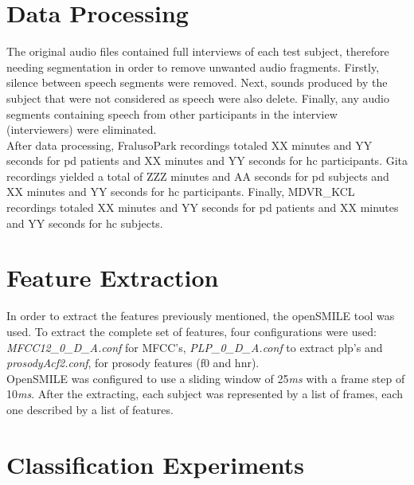 \section{Data Processing}

The original audio files contained full interviews of each test subject, therefore needing segmentation in order to remove unwanted audio fragments. Firstly, silence between speech segments were removed. Next, sounds produced by the subject that were not considered as speech were also delete. Finally, any audio segments containing speech from other participants in the interview (interviewers) were eliminated.
\\
After data processing, FralusoPark recordings totaled XX minutes and YY seconds for \gls{pd} patients and XX minutes and YY seconds for \gls{hc} participants. Gita recordings yielded a total of ZZZ minutes and AA seconds for \gls{pd} subjects and XX minutes and YY seconds for \gls{hc} participants. Finally, MDVR\_KCL recordings totaled XX minutes and YY seconds for \gls{pd} patients and XX minutes and YY seconds for \gls{hc} subjects.

\section{Feature Extraction}

In order to extract the features previously mentioned, the openSMILE \cite{openSMILE} tool was used. To extract the complete set of features, four configurations were used: \textit{MFCC12\_0\_D\_A.conf} for MFCC's, \textit{PLP\_0\_D\_A.conf} to extract \gls{plp}'s and \textit{prosodyAcf2.conf}, for prosody features (\gls{f0} and \gls{hnr}).
\\
OpenSMILE was configured to use a sliding window of 25\textit{ms} with a frame step of 10\textit{ms}. After the extracting, each subject was represented by a list of frames, each one described by a list of features.

\section{Classification Experiments}

